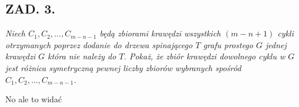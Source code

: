 \documentclass{article}
\begin{document}
\subsection*{ZAD. 3.}
\emph{Niech $C_1,C_2,...,C_{m-n-1}$ będą zbiorami krawędzi wszystkich $(m-n+1)$ cykli otrzymanych poprzez dodanie do drzewa spinającego $T$ grafu prostego $G$ jednej krawędzi $G$ która nie należy do $T$. Pokaż, że zbiór krawędzi dowolnego cyklu w $G$ jest różnica symetryczną pewnej liczby zbiorów wybranych spośród $C_1,C_2,...,C_{m-n-1}$.}
\medskip

\medskip

No ale to widać
\end{document}
